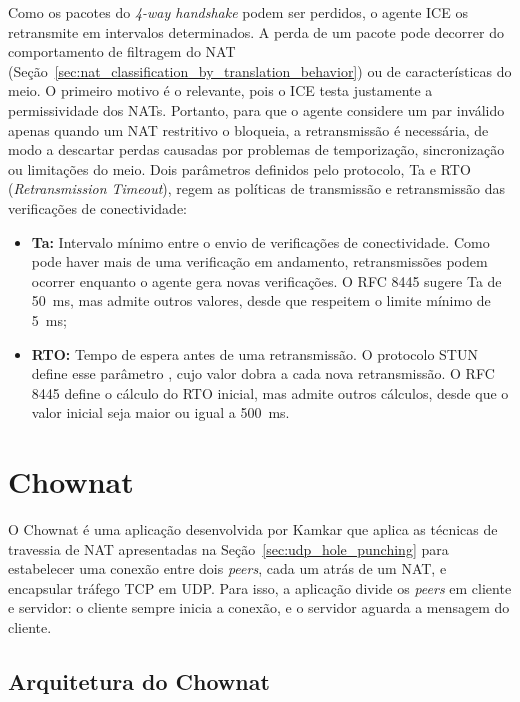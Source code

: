 Como os pacotes do \textit{4-way handshake} podem ser perdidos, o agente ICE os retransmite em intervalos determinados. A perda de um pacote pode decorrer do comportamento de filtragem do NAT (Seção~\ref{sec:nat_classification_by_translation_behavior}) ou de características do meio. O primeiro motivo é o relevante, pois o ICE testa justamente a permissividade dos NATs. Portanto, para que o agente considere um par inválido apenas quando um NAT restritivo o bloqueia, a retransmissão é necessária, de modo a descartar perdas causadas por problemas de temporização, sincronização ou limitações do meio. Dois parâmetros definidos pelo protocolo, Ta e RTO (\textit{Retransmission Timeout}), regem as políticas de transmissão e retransmissão das verificações de conectividade:

\begin{itemize}
    \item \textbf{Ta:} Intervalo mínimo entre o envio de verificações de conectividade. Como pode haver mais de uma verificação em andamento, retransmissões podem ocorrer enquanto o agente gera novas verificações. O RFC 8445 sugere Ta de 50~ms, mas admite outros valores, desde que respeitem o limite mínimo de 5~ms;
    \item \textbf{RTO:} Tempo de espera antes de uma retransmissão. O protocolo STUN define esse parâmetro \citep{rfc8489}, cujo valor dobra a cada nova retransmissão. O RFC 8445 define o cálculo do RTO inicial, mas admite outros cálculos, desde que o valor inicial seja maior ou igual a 500~ms.
\end{itemize}

\section{Chownat}
\label{sec:chownat}

O Chownat é uma aplicação desenvolvida por Kamkar \citep{kamkar2004chownat} que aplica as técnicas de travessia de NAT apresentadas na Seção~\ref{sec:udp_hole_punching} para estabelecer uma conexão entre dois \textit{peers}, cada um atrás de um NAT, e encapsular tráfego TCP em UDP. Para isso, a aplicação divide os \textit{peers} em cliente e servidor: o cliente sempre inicia a conexão, e o servidor aguarda a mensagem do cliente.

\subsection{Arquitetura do Chownat}

